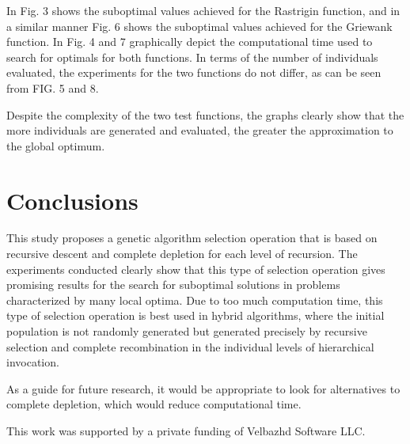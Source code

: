 \documentclass[graybox]{styles/svmult}
\begin{document}
In Fig. 3 shows the suboptimal values achieved for the Rastrigin function, and in a similar manner Fig. 6 shows the suboptimal values achieved for the Griewank function. In Fig. 4 and 7 graphically depict the computational time used to search for optimals for both functions. In terms of the number of individuals evaluated, the experiments for the two functions do not differ, as can be seen from FIG. 5 and 8.

Despite the complexity of the two test functions, the graphs clearly show that the more individuals are generated and evaluated, the greater the approximation to the global optimum.

\section{Conclusions}
\label{sec:4}

This study proposes a genetic algorithm selection operation that is based on recursive descent and complete depletion for each level of recursion. The experiments conducted clearly show that this type of selection operation gives promising results for the search for suboptimal solutions in problems characterized by many local optima. Due to too much computation time, this type of selection operation is best used in hybrid algorithms, where the initial population is not randomly generated but generated precisely by recursive selection and complete recombination in the individual levels of hierarchical invocation.

As a guide for future research, it would be appropriate to look for alternatives to complete depletion, which would reduce computational time.

\begin{acknowledgement}
This work was supported by a private funding of Velbazhd Software LLC. 
\end{acknowledgement}


\end{document}

